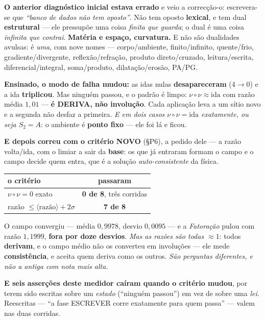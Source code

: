 \documentclass[11pt]{article}
\theoremstyle{plain}
\theoremstyle{remark}
\begin{document}
\begin{itemize}
\noindent \textbf{O anterior diagnóstico inicial estava errado} e veio a correcção-o: escrevera-se que
\emph{``banco de dados não tem oposto''}. Não tem oposto \textbf{lexical}, e tem dual
\textbf{estrutural} --- ele pressupõe uma coisa \emph{finita que guarda}; o dual é uma coisa
\emph{infinita que contrai}. \textbf{Matéria e espaço, curvatura.} E não são dualidades avulsas: é
\emph{uma}, com nove nomes --- corpo/ambiente, finito/infinito, quente/frio, gradiente/divergente,
reflexão/refração, produto direto/cruzado, leitura/escrita, diferencial/integral, soma/produto,
dilatação/erosão, PA/PG.

\textbf{Ensinado, o modo de falha mudou:} as idas nulas \textbf{desapareceram} (4$\to$0) e a ida
\textbf{triplicou}. Mas ninguém passou, e o padrão é limpo: $\nu\circ\nu \approx \text{ida}$ com
razão média $1{,}01$ --- \textbf{é DERIVA, não involução}. Cada aplicação leva a um sítio novo e a
segunda não desfaz a primeira. \emph{E em dois casos $\nu\circ\nu = \text{ida}$ exatamente, ou seja
$S_2 = A$}: o ambiente é \textbf{ponto fixo} --- ele foi lá e ficou.

\textbf{E depois correu com o critério NOVO} (§P6), a pedido dele --- a razão volta/ida, com o
limiar a sair da \textbf{base}: os que já entraram formam o campo e o campo decide quem entra, que é
a solução \emph{auto-consistente} da física.

\begin{center}
\begin{tabular}{lc}
\toprule
o critério & passaram \\
\midrule
$\nu\circ\nu = 0$ exato & \textbf{0 de 8}, três corridas \\
razão $\leq \langle\text{razão}\rangle + 2\sigma$ & \textbf{7 de 8} \\
\bottomrule
\end{tabular}
\end{center}

\noindent O campo convergiu --- média $0{,}9978$, desvio $0{,}0095$ --- e a \emph{Fatoração} pulou
com razão $1{,}1999$, \textbf{fora por doze desvios}. \emph{Mas as razões são todas $\approx 1$}:
todos \textbf{derivam}, e o campo médio não os converteu em involuções --- ele mede
\textbf{consistência}, e aceita quem deriva como os outros. \emph{São perguntas diferentes, e não a
antiga com nota mais alta.}

\textbf{E seis asserções deste medidor caíram quando o critério mudou}, por terem sido escritas
sobre um \emph{estado} (``ninguém passou'') em vez de sobre uma \emph{lei}. Reescritas --- ``a fase
ESCREVER corre exatamente para quem passa'' --- valem nas duas corridas.


\end{itemize}
\end{document}
